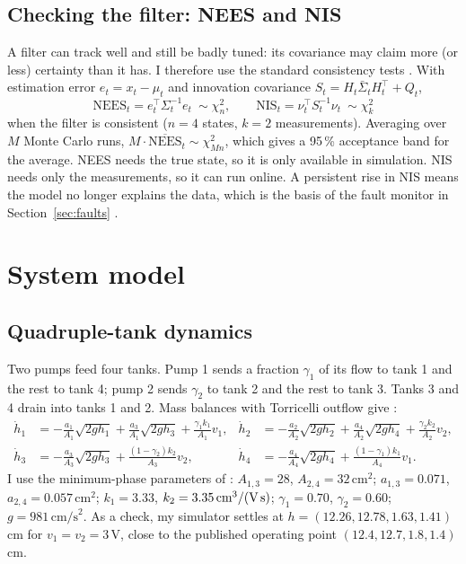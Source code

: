 \documentclass[11pt]{article}
\begin{document}
\subsection{Checking the filter: NEES and NIS}
A filter can track well and still be badly tuned: its covariance may claim more (or less) certainty than it has. I therefore use the standard consistency tests \cite{barshalom2001}. With estimation error $e_t=x_t-\mu_t$ and innovation covariance $S_t=H_t\bar\Sigma_tH_t^\top+Q_t$,
\begin{equation}
\text{NEES}_t=e_t^\top\Sigma_t^{-1}e_t\ \sim\chi^2_n,\qquad \text{NIS}_t=\nu_t^\top S_t^{-1}\nu_t\ \sim\chi^2_k
\end{equation}
when the filter is consistent ($n=4$ states, $k=2$ measurements). Averaging over $M$ Monte Carlo runs, $M\cdot\overline{\text{NEES}}_t\sim\chi^2_{Mn}$, which gives a 95\,\% acceptance band for the average. NEES needs the true state, so it is only available in simulation. NIS needs only the measurements, so it can run online. A persistent rise in NIS means the model no longer explains the data, which is the basis of the fault monitor in Section~\ref{sec:faults} \cite{mehra1970,willsky1976}.

\section{System model}
\subsection{Quadruple-tank dynamics}
Two pumps feed four tanks. Pump 1 sends a fraction $\gamma_1$ of its flow to tank 1 and the rest to tank 4; pump 2 sends $\gamma_2$ to tank 2 and the rest to tank 3. Tanks 3 and 4 drain into tanks 1 and 2. Mass balances with Torricelli outflow give \cite{johansson2000}:
\begin{equation}
\begin{aligned}
\dot h_1&=-\tfrac{a_1}{A_1}\sqrt{2gh_1}+\tfrac{a_3}{A_1}\sqrt{2gh_3}+\tfrac{\gamma_1k_1}{A_1}v_1, &
\dot h_2&=-\tfrac{a_2}{A_2}\sqrt{2gh_2}+\tfrac{a_4}{A_2}\sqrt{2gh_4}+\tfrac{\gamma_2k_2}{A_2}v_2,\\
\dot h_3&=-\tfrac{a_3}{A_3}\sqrt{2gh_3}+\tfrac{(1-\gamma_2)k_2}{A_3}v_2, &
\dot h_4&=-\tfrac{a_4}{A_4}\sqrt{2gh_4}+\tfrac{(1-\gamma_1)k_1}{A_4}v_1 .
\end{aligned}
\end{equation}
I use the minimum-phase parameters of \cite{johansson2000}: $A_{1,3}=28$, $A_{2,4}=32\,\text{cm}^2$; $a_{1,3}=0.071$, $a_{2,4}=0.057\,\text{cm}^2$; $k_1=3.33$, $k_2=3.35\,\text{cm}^3/(\text{V\,s})$; $\gamma_1=0.70$, $\gamma_2=0.60$; $g=981\,\text{cm/s}^2$. As a check, my simulator settles at $h=(12.26,12.78,1.63,1.41)$\,cm for $v_1=v_2=3$\,V, close to the published operating point $(12.4,12.7,1.8,1.4)$\,cm.
\end{document}
